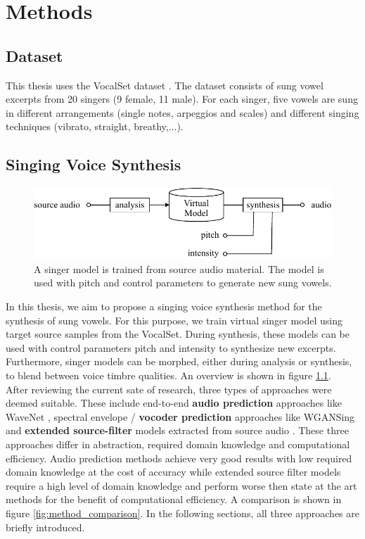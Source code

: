 
\chapter{Methods}

\section{Dataset}

This thesis uses the VocalSet dataset \cite{wilkins_vocalset:_2018}. The dataset consists of sung vowel excerpts from 20 singers (9 female, 11 male). For each singer, five vowels are sung in different arrangements (single notes, arpeggios and scales) and different singing techniques (vibrato, straight, breathy,...). 

\section{Singing Voice Synthesis}

\begin{figure}[H]
    \centering
    \includegraphics{Graphics/005_method_singer_model.pdf}
    \caption{A singer model is trained from source audio material. The model is used with pitch and control parameters to generate new sung vowels.}
    \label{fig:singer_model}
\end{figure}

In this thesis, we aim to propose a singing voice synthesis method for the synthesis of sung vowels. For this purpose, we train virtual singer model using target source samples from the VocalSet. During synthesis, these models can be used with control parameters pitch and intensity to synthesize new excerpts. Furthermore, singer models can be morphed, either during analysis or synthesis, to blend between voice timbre qualities. An overview is shown in figure \ref{fig:singer_model}.\\

After reviewing the current sate of research, three types of approaches were deemed suitable. These include end-to-end \textbf{audio prediction} approaches like WaveNet \cite{oord_wavenet:_2016}, spectral envelope / \textbf{vocoder prediction} approaches like WGANSing \cite{chandna_wgansing:_2019} and \textbf{extended source-filter} models extracted from source audio \cite{schleusing_joint_2013}. These three  approaches differ in abstraction, required domain knowledge and computational efficiency. Audio prediction methods achieve very good results with low required domain knowledge at the cost of accuracy while extended source filter models require a high level of domain knowledge and perform worse then state at the art methods for the benefit of computational efficiency. A comparison is shown in figure \ref{fig:method_comparison}. In the following sections, all three approaches are briefly introduced. 

